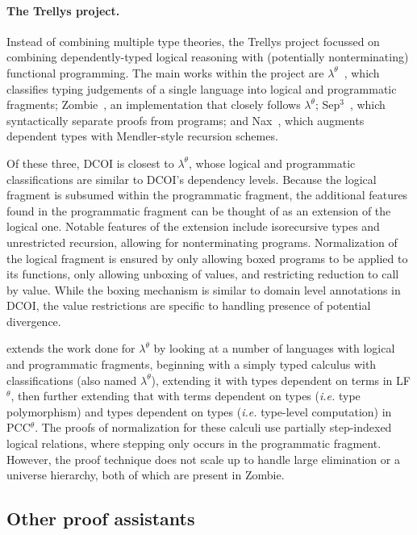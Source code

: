 \documentclass{article}
\makeatletter
\newcommand{\ie}{\textit{i.e.}\@\xspace}
\makeatother
\begin{document}
\paragraph{The Trellys project.}
Instead of combining multiple type theories,
the Trellys project focussed on combining dependently-typed logical reasoning
with (potentially nonterminating) functional programming.
The main works within the project are $\lambda^\theta$~\citep{lambda-theta},
which classifies typing judgements of a single language into logical and programmatic fragments;
Zombie~\citep{zombie}, an implementation that closely follows $\lambda^\theta$;
Sep$^3$~\citep{sep3}, which syntactically separate proofs from programs;
and Nax~\citep{nax}, which augments dependent types with Mendler-style recursion schemes.

Of these three, DCOI is closest to $\lambda^\theta$,
whose logical and programmatic classifications are similar to DCOI's dependency levels.
Because the logical fragment is subsumed within the programmatic fragment,
the additional features found in the programmatic fragment can be thought of
as an extension of the logical one.
Notable features of the extension include isorecursive types and unrestricted recursion,
allowing for nonterminating programs.
Normalization of the logical fragment is ensured by
only allowing boxed programs to be applied to its functions,
only allowing unboxing of values,
and restricting reduction to call by value.
While the boxing mechanism is similar to domain level annotations in DCOI,
the value restrictions are specific to handling presence of potential divergence.

 extends the work done for $\lambda^\theta$
by looking at a number of languages with logical and programmatic fragments,
beginning with a simply typed calculus with classifications (also named $\lambda^\theta$),
extending it with types dependent on terms in LF$^\theta$,
then further extending that with terms dependent on types (\ie type polymorphism)
and types dependent on types (\ie type-level computation) in PCC$^\theta$.
The proofs of normalization for these calculi use partially step-indexed logical relations,
where stepping only occurs in the programmatic fragment.
However, the proof technique does not scale up to handle large elimination or a universe hierarchy,
both of which are present in Zombie.

\subsection{Other proof assistants}
\end{document}
